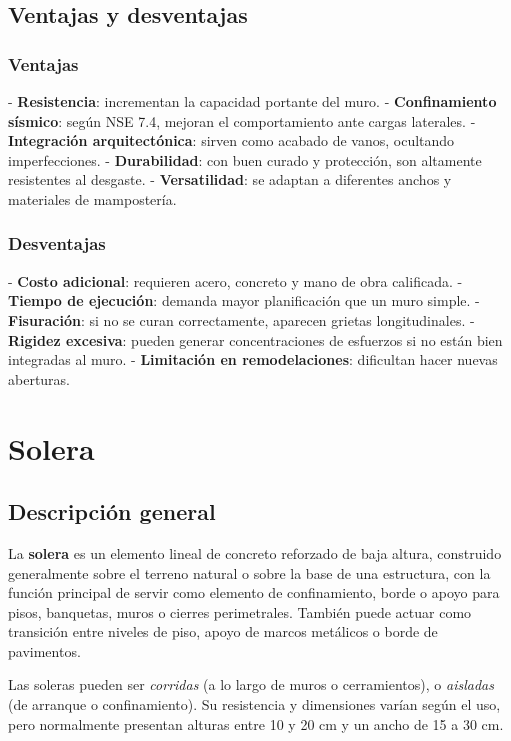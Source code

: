 \documentclass[12pt]{article}
\begin{document}
	\subsection{Ventajas y desventajas}
	
	\subsubsection{Ventajas}
	- \textbf{Resistencia}: incrementan la capacidad portante del muro.  
	- \textbf{Confinamiento sísmico}: según NSE 7.4, mejoran el comportamiento ante cargas laterales.  
	- \textbf{Integración arquitectónica}: sirven como acabado de vanos, ocultando imperfecciones.  
	- \textbf{Durabilidad}: con buen curado y protección, son altamente resistentes al desgaste.  
	- \textbf{Versatilidad}: se adaptan a diferentes anchos y materiales de mampostería.  
	
	\subsubsection{Desventajas}
	- \textbf{Costo adicional}: requieren acero, concreto y mano de obra calificada.  
	- \textbf{Tiempo de ejecución}: demanda mayor planificación que un muro simple.  
	- \textbf{Fisuración}: si no se curan correctamente, aparecen grietas longitudinales.  
	- \textbf{Rigidez excesiva}: pueden generar concentraciones de esfuerzos si no están bien integradas al muro.  
	- \textbf{Limitación en remodelaciones}: dificultan hacer nuevas aberturas.  
	

	\section{Solera}
	\subsection{Descripción general}
	
	La \textbf{solera} es un elemento lineal de concreto reforzado de baja altura, construido generalmente sobre el terreno natural o sobre la base de una estructura, con la función principal de servir como elemento de confinamiento, borde o apoyo para pisos, banquetas, muros o cierres perimetrales. También puede actuar como transición entre niveles de piso, apoyo de marcos metálicos o borde de pavimentos.
	
	Las soleras pueden ser \textit{corridas} (a lo largo de muros o cerramientos), o \textit{aisladas} (de arranque o confinamiento). Su resistencia y dimensiones varían según el uso, pero normalmente presentan alturas entre 10 y 20 cm y un ancho de 15 a 30 cm.
	
\end{document}
